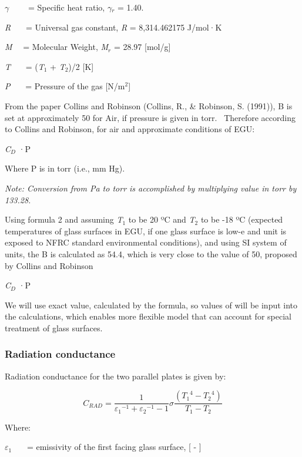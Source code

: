 $\gamma$~~~~ = Specific heat ratio, $\gamma$\(_{r}\) = 1.40.

\emph{R}~~~ = Universal gas constant, \emph{R} = 8,314.462175 J/mol·K

\emph{M}~~ = Molecular Weight, \emph{M}\(_{r}\) = 28.97 {[}mol/g{]}

\emph{T}~~~ = (\emph{T}\(_{1}\) + \emph{T}\(_{2}\))/2 {[}K{]}

\emph{P}~~~ = Pressure of the gas {[}N/m\(^{2}\){]}

From the paper Collins and Robinson (Collins, R., \& Robinson, S. (1991)), B is set at approximately 50 for Air, if pressure is given in torr.~ Therefore according to Collins and Robinson, for air and approximate conditions of EGU:

\emph{C}\(_{D}\) ·P

Where P is in torr (i.e., mm Hg).

\emph{Note: Conversion from Pa to torr is accomplished by multiplying value in torr by 133.28.}

Using formula 2 and assuming \emph{T}\(_{1}\) to be 20 ºC and \emph{T}\(_{2}\) to be -18 ºC (expected temperatures of glass surfaces in EGU, if one glass surface is low-e and unit is exposed to NFRC standard environmental conditions), and using SI system of units, the B is calculated as 54.4, which is very close to the value of 50, proposed by Collins and Robinson

\emph{C}\(_{D}\) ·P

We will use exact value, calculated by the formula, so values of will be input into the calculations, which enables more flexible model that can account for special treatment of glass surfaces.

\subsubsection{Radiation conductance}\label{radiation-conductance}

Radiation conductance for the two parallel plates is given by:

\begin{equation}
{C_{RAD}} = \frac{1}{{{\varepsilon_1}^{ - 1} + {\varepsilon_2}^{ - 1} - 1}}\sigma \frac{{\left( {{T_1}^4 - {T_2}^4} \right)}}{{{T_1} - {T_2}}}
\end{equation}

Where:

$\varepsilon$\(_{1}\)~~~ = emissivity of the first facing glass surface, {[} - {]}

